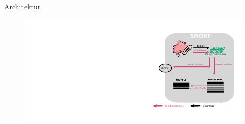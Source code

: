 \begin{frame}{Architektur}
    \begin{figure}
    	\centering
    	\includegraphics[width=\textwidth]{./images/6.pdf}
    \end{figure}
\end{frame}
